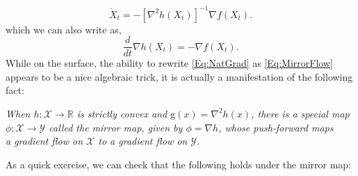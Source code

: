 \documentclass[11pt]{article}
\theoremstyle{plain}
\newcommand{\R}{{\mathbb R}}
\newcommand{\X}{{\mathcal X}}
\begin{document}
\begin{equation}\label{Eq:NatGrad}
\dot X_t = -[\nabla^2 h(X_t)]^{-1} \nabla f(X_t).
\end{equation}
which we can also write as,
\begin{equation}\label{Eq:MirrorFlow}
\frac{d}{dt} \nabla h(X_t) = - \nabla f(X_t).
\end{equation}
While on the surface, the ability to rewrite \eqref{Eq:NatGrad} as \eqref{Eq:MirrorFlow} appears to be a nice algebraic trick, it is actually a manifestation of the following fact: \begin{center}{\em When $h:\X \rightarrow \R$ is strictly convex and $\mathrm{g}(x)= \nabla^2 h(x)$, there is a special map \\$\phi:\X \rightarrow \mathcal{Y}$ called the {\em mirror map}, given by $\phi = \nabla h$, whose push-forward maps\\ a gradient flow on $\X$ to a gradient flow on $\mathcal{Y}$. \cite{Acceleration}}\end{center} As a quick exercise, we can check that the following holds under the mirror map:
\end{document}
